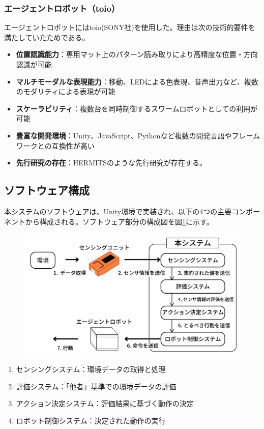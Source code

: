 \documentclass{cuxarticle}
\begin{document}
\subsubsection{エージェントロボット（toio）}
エージェントロボットにはtoio(SONY社)\cite{--小さなキ}を使用した。理由は次の技術的要件を満たしていたためである。

\begin{itemize}
  \item \textbf{位置認識能力}：専用マット上のパターン読み取りにより高精度な位置・方向認識が可能
  \item \textbf{マルチモーダルな表現能力}：移動、LEDによる色表現、音声出力など、複数のモダリティによる表現が可能
  \item \textbf{スケーラビリティ}：複数台を同時制御するスワームロボットとしての利用が可能
  \item \textbf{豊富な開発環境}：Unity、JavaScript、Pythonなど複数の開発言語やフレームワークとの互換性が高い
  \item \textbf{先行研究の存在}：HERMITS\cite{--HERMITSProceedings33rdAnnual}のような先行研究が存在する。
\end{itemize}

\subsection{ソフトウェア構成}
本システムのソフトウェアは、Unity環境で実装され、以下の4つの主要コンポーネントから構成される。ソフトウェア部分の構成図を図\ref{fig:software-architecture}に示す。

\begin{figure}[h]
  \centering
  \includegraphics[keepaspectratio, width=0.6\columnwidth]{resources/system_structure.png}
  \caption[short]{}
  \label{fig:software-architecture}
\end{figure}

\begin{enumerate}
  \item センシングシステム：環境データの取得と処理
  \item 評価システム：「他者」基準での環境データの評価
  \item アクション決定システム：評価結果に基づく動作の決定
  \item ロボット制御システム：決定された動作の実行
\end{enumerate}
\end{document}
